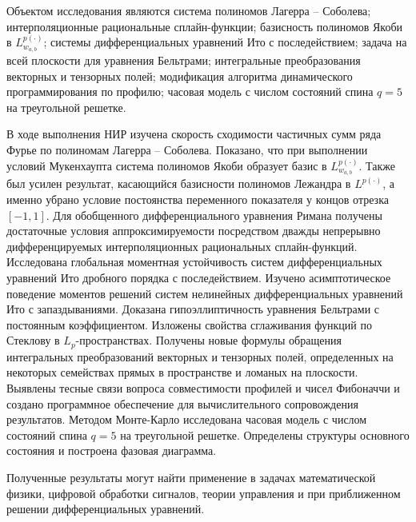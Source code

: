 


Объектом исследования являются система полиномов Лагерра -- Соболева; интерполяционные рациональные сплайн-функции;
базисность полиномов Якоби в $L^{p(\cdot)}_{w_{a,b}}$;
системы дифференциальных уравнений Ито с последействием;
задача на всей плоскости для уравнения Бельтрами;
интегральные преобразования векторных и тензорных полей;
модификация алгоритма динамического программирования по профилю;
часовая модель с числом состояний спина $q=5$ на треугольной решетке.

В ходе выполнения НИР изучена  скорость сходимости частичных сумм ряда Фурье по полиномам Лагерра -- Соболева.
Показано, что при выполнении условий Мукенхаупта система полиномов Якоби образует базис в $L^{p(\cdot)}_{w_{a,b}}$.
Также был усилен результат, касающийся базисности полиномов Лежандра в $L^{p(\cdot)}$, а именно убрано условие постоянства переменного показателя у концов отрезка $[-1,1]$.
Для обобщенного дифференциального уравнения Римана получены достаточные условия аппроксимируемости посредством дважды непрерывно
 дифференцируемых интерполяционных рациональных сплайн-функций.
Исследована глобальная моментная устойчивость систем дифференциальных уравнений Ито дробного порядка с последействием. Изучено асимптотическое поведение моментов решений систем нелинейных дифференциальных уравнений Ито с запаздываниями.
Доказана гипоэллиптичность уравнения Бельтрами с постоянным коэффициентом. Изложены свойства сглаживания функций по Стеклову в $L_p$-пространствах.
Получены новые формулы обращения интегральных преобразований векторных и тензорных полей, определенных на некоторых семействах прямых в пространстве и ломаных на плоскости.
Выявлены тесные связи вопроса совместимости профилей и чисел Фибоначчи и создано программное обеспечение для вычислительного сопровождения результатов.
Методом Монте-Карло исследована часовая модель с числом состояний спина $q=5$ на треугольной решетке. Определены структуры основного состояния и построена фазовая диаграмма.

Полученные результаты могут найти применение в задачах математической физики, цифровой обработки сигналов, теории управления и при приближенном решении дифференциальных уравнений. 